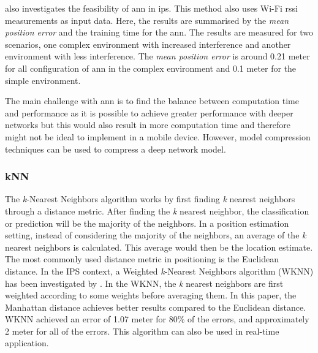 \cite{ANN02} also investigates the feasibility of \gls{ann} in \gls{ips}. This method also uses Wi-Fi \gls{rssi} measurements as input data. Here, the results are summarised by the \textit{mean position error} and the training time for the \gls{ann}. The results are measured for two scenarios, one complex environment with increased interference and another environment with less interference. The \textit{mean position error} is around 0.21 meter for all configuration of \gls{ann} in the complex environment and 0.1 meter for the simple environment. 

The main challenge with \gls{ann} is to find the balance between computation time and performance as it is possible to achieve greater performance with deeper networks but this would also result in more computation time and therefore might not be ideal to implement in a mobile device. However, model compression techniques can be used to compress a deep network model.

\subsubsection{kNN}
The \textit{k}-Nearest Neighbors algorithm works by first finding \textit{k} nearest neighbors through a distance metric. After finding the \textit{k} nearest neighbor, the classification or prediction will be the majority of the neighbors. In a position estimation setting, instead of considering the majority of the neighbors, an average of the \textit{k} nearest neighbors is calculated. This average would then be the location estimate. The most commonly used distance metric in positioning is the Euclidean distance. \cite{IPS01} In the IPS context, a Weighted \textit{k}-Nearest Neighbors algorithm (WKNN) has been investigated by \cite{wknn}. In the WKNN, the \textit{k} nearest neighbors are first weighted according to some weights before averaging them. In this paper, the Manhattan distance achieves better results compared to the Euclidean distance. WKNN achieved an error of 1.07 meter for 80\% of the errors, and approximately 2 meter for all of the errors. This algorithm can also be used in real-time application.

